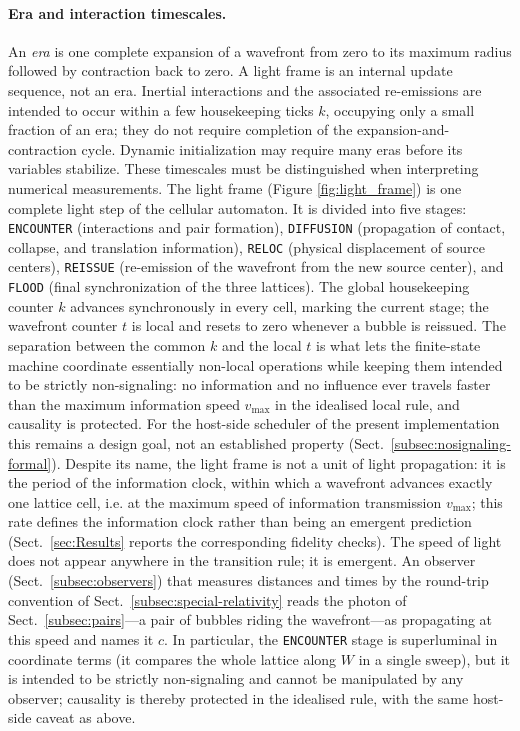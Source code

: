 \documentclass{ijuc}
\begin{document}
\paragraph{Era and interaction timescales.} An \emph{era} is one complete expansion of a wavefront from zero to its maximum radius followed by contraction back to zero. A light frame is an internal update sequence, not an era. Inertial interactions and the associated re-emissions are intended to occur within a few housekeeping ticks $k$, occupying only a small fraction of an era; they do not require completion of the expansion-and-contraction cycle. Dynamic initialization may require many eras before its variables stabilize. These timescales must be distinguished when interpreting numerical measurements.
The light frame (Figure \ref{fig:light_frame}) is one complete light step of the cellular automaton. It is divided into five stages: \texttt{ENCOUNTER} (interactions and pair formation), \texttt{DIFFUSION} (propagation of contact, collapse, and translation information), \texttt{RELOC} (physical displacement of source centers), \texttt{REISSUE} (re-emission of the wavefront from the new source center), and \texttt{FLOOD} (final synchronization of the three lattices). The global housekeeping counter $k$ advances synchronously in every cell, marking the current stage; the wavefront counter $t$ is local and resets to zero whenever a bubble is reissued. The separation between the common $k$ and the local $t$ is what lets the finite-state machine coordinate essentially non-local operations while keeping them intended to be strictly non-signaling: no information and no influence ever travels faster than the maximum information speed $v_{\max}$ in the idealised local rule, and causality is protected.  For the host-side scheduler of the present implementation this remains a design goal, not an established property (Sect.~\ref{subsec:nosignaling-formal}).
Despite its name, the light frame is not a unit of light propagation: it is the period of the information clock, within which a wavefront advances exactly one lattice cell, i.e. at the maximum speed of information transmission $v_{\max}$; this rate defines the information clock rather than being an emergent prediction (Sect.~\ref{sec:Results} reports the corresponding fidelity checks). The speed of light does not appear anywhere in the transition rule; it is emergent. An observer (Sect.~\ref{subsec:observers}) that measures distances and times by the round-trip convention of Sect.~\ref{subsec:special-relativity} reads the photon of Sect.~\ref{subsec:pairs}---a pair of bubbles riding the wavefront---as propagating at this speed and names it $c$. In particular, the \texttt{ENCOUNTER} stage is superluminal in coordinate terms (it compares the whole lattice along $W$ in a single sweep), but it is intended to be strictly non-signaling and cannot be manipulated by any observer; causality is thereby protected in the idealised rule, with the same host-side caveat as above.
\end{document}
